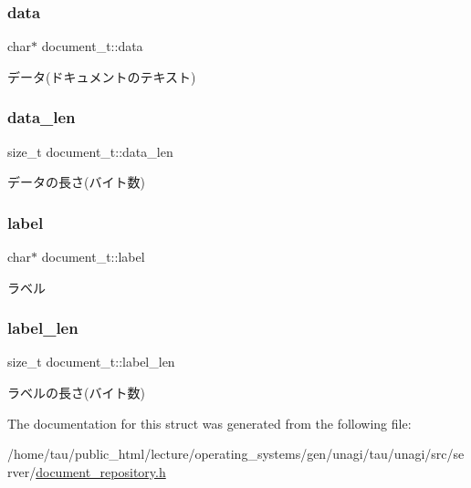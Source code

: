 \subsubsection{\texorpdfstring{data}{data}}
{\footnotesize\ttfamily char$\ast$ document\+\_\+t\+::data}

データ(ドキュメントのテキスト) \mbox{\label{structdocument__t_a39aff76b482302a6872c04a1d0fba28f}} 
\subsubsection{\texorpdfstring{data\+\_\+len}{data\_len}}
{\footnotesize\ttfamily size\+\_\+t document\+\_\+t\+::data\+\_\+len}

データの長さ(バイト数) \mbox{\label{structdocument__t_adc78927f2a7a1579e3fd1c965abba435}} 
\subsubsection{\texorpdfstring{label}{label}}
{\footnotesize\ttfamily char$\ast$ document\+\_\+t\+::label}

ラベル \mbox{\label{structdocument__t_aa941cb26dde0de815f368e4503a689a3}} 
\subsubsection{\texorpdfstring{label\+\_\+len}{label\_len}}
{\footnotesize\ttfamily size\+\_\+t document\+\_\+t\+::label\+\_\+len}

ラベルの長さ(バイト数) 

The documentation for this struct was generated from the following file\+:\begin{DoxyCompactItemize}
\item 
/home/tau/public\+\_\+html/lecture/operating\+\_\+systems/gen/unagi/tau/unagi/src/server/\hyperlink{document__repository_8h}{document\+\_\+repository.\+h}\end{DoxyCompactItemize}
